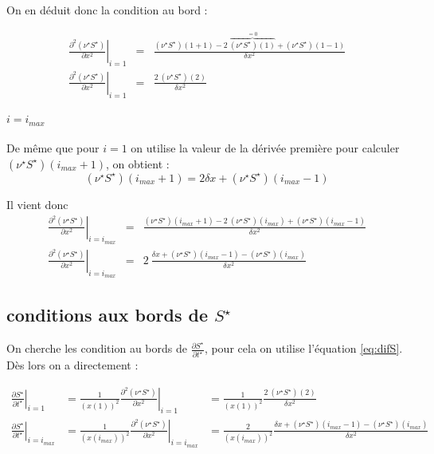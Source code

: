 On en déduit donc la condition au bord :

\begin{eqnarray}
  \left. \frac{\partial^2 (\nu^{\star} S^{\star})}{\partial x^2}\right|_{i=1} &=& \frac{(\nu^{\star} S^{\star})(1+1) -2\ \overbrace{(\nu^{\star} S^{\star})(1)}^{=0}+ (\nu^{\star} S^{\star})(1-1)}{\delta x ^2} \\
  \left. \frac{\partial^2 (\nu^{\star} S^{\star})}{\partial x^2}\right|_{i=1} &=& \frac{2\ (\nu^{\star} S^{\star})(2)}{\delta x ^2}
\end{eqnarray}

\paragraph{$i=i_{max}$}
De même que pour $i=1$ on utilise la valeur de la dérivée première pour calculer $(\nu^{\star} S^{\star})(i_{max}+1)$, on obtient :
\begin{equation}
  (\nu^{\star} S^{\star})(i_{max}+1)=2\delta x + (\nu^{\star} S^{\star})(i_{max}-1)
\end{equation}

Il vient donc 
\begin{eqnarray}
  \left. \frac{\partial^2 (\nu^{\star} S^{\star})}{\partial x^2}\right|_{i=i_{max}} &=& \frac{(\nu^{\star} S^{\star})(i_{max}+1) - 2\ (\nu^{\star} S^{\star})(i_{max}) + (\nu^{\star} S^{\star})(i_{max}-1)}{\delta x^2}\\
  \left. \frac{\partial^2 (\nu^{\star} S^{\star})}{\partial x^2}\right|_{i=i_{max}} &=& 2\ \frac{\delta x + (\nu^{\star} S^{\star})(i_{max}-1)- (\nu^{\star} S^{\star})(i_{max})}{\delta x^2}
\end{eqnarray}

\subsection{conditions aux bords de $S^{\star}$}
On cherche les condition au bords de $\frac{\partial S^{\star}}{\partial t^{\star}}$, pour cela on utilise l'équation \eqref{eq:difS}. Dès lors on a directement :

\begin{eqnarray}
  \left. \frac{\partial S^{\star}}{\partial t^{\star}} \right|_{i=1} &= \frac{1}{(x(1))^2} \left. \frac{\partial^2 (\nu^{\star} S^{\star})}{\partial x^2}\right|_{i=1} &= \frac{1}{(x(1))^2} \frac{2\ (\nu^{\star} S^{\star})(2)}{\delta x ^2}\\
  \left. \frac{\partial S^{\star}}{\partial t^{\star}} \right|_{i=i_{max}}&= \frac{1}{(x(i_{max}))^2} \left. \frac{\partial^2 (\nu^{\star} S^{\star})}{\partial x^2}\right|_{i=i_{max}} &= \frac{2}{(x(i_{max}))^2} \frac{\delta x + (\nu^{\star} S^{\star})(i_{max}-1)- (\nu^{\star} S^{\star})(i_{max})}{\delta x^2}
\end{eqnarray}

